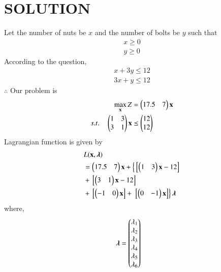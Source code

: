 \documentclass[journal,12pt,twocolumn]{IEEEtran}
\begin{document}
\section{SOLUTION} 
\begin{table}[!ht]
\centering
{}
\caption{Manufacturer produces nuts and bolts}
\label{tab:table1}
\end{table}
Let the number of nuts  be $x$ and the number of bolts be $y$  such that 
\begin{align}
x \geq 0 \\
y \geq 0 
\end{align}
According to the question,
\begin{align}
{x} + 3{y} \leq 12
\\
3{x} + {y} \leq 12
\end{align}
$\therefore$ Our problem is
\begin{align}
\max_{\mathbf{x}} Z &= \begin{pmatrix}17.5 & 7\end{pmatrix}\mathbf{x}\\
s.t. \quad \begin{pmatrix}1 & 3 \\ 3 & 1\end{pmatrix}\mathbf{x} &\preceq \begin{pmatrix}12\\12\end{pmatrix} 
\end{align}
Lagrangian function is given by
\begin{equation}
\begin{aligned}
&L(\mathbf{x},\boldsymbol{\lambda}) \\ &= \begin{pmatrix}17.5 & 7\end{pmatrix}\mathbf{x}+\left\{{}\left[\begin{pmatrix}1 & 3\end{pmatrix}\mathbf{x}-12\right]\right. \\ &+ {}\left[\begin{pmatrix}3 & 1\end{pmatrix}\mathbf{x}-12\right]\\ &+ {}\left[\begin{pmatrix}-1 & 0\end{pmatrix}\mathbf{x}\right] +\left.{}\left[\begin{pmatrix}0 & -1\end{pmatrix}\mathbf{x}\right]\right\}\boldsymbol{\lambda}
\end{aligned}
\end{equation}
where,
\begin{align}
\boldsymbol{\lambda} &= \begin{pmatrix}\lambda_1 \\ \lambda_2 \\ \lambda_3 \\ \lambda_4 \\ \lambda_5 \\ \lambda_6\end{pmatrix}
\end{align}
\end{document}
